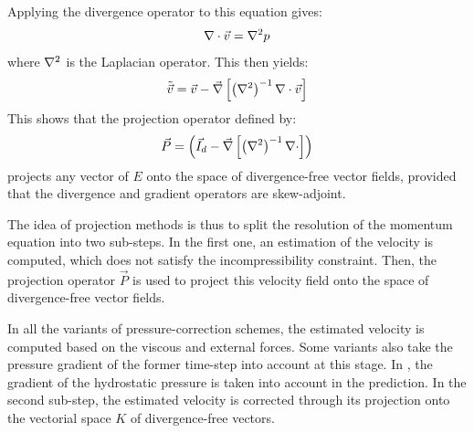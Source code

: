 Applying the divergence operator to this equation gives:
\begin{equation}
  \nabla \cdot \vec v = \nabla^2 p
\end{equation}
where $\nabla^2$ is the Laplacian operator. This then yields:
\begin{equation}
  \tilde {\vec {v}} = \vec v - \vec \nabla \left[\left(\nabla^2 \right)^{-1} \nabla \cdot \vec v\right]
\end{equation}
This shows that the projection operator defined by:
\begin{equation}
  \vec P = \left(\vec{I}_d-\vec \nabla \left[\left(\nabla^2 \right)^{-1} \nabla \cdot \right]\right)
\end{equation}
projects any vector of $E$ onto the space of divergence-free vector fields, provided that the divergence and gradient operators are skew-adjoint.

The idea of projection methods is thus to split the resolution of the momentum equation into two sub-steps.
In the first one, an estimation of the velocity is computed, which does not satisfy the incompressibility constraint.
Then, the projection operator $\vec P$ is used to project this velocity field onto the space of divergence-free vector fields.

In all the variants of pressure-correction schemes, the estimated velocity is computed based on the viscous and external forces.
Some variants also take the pressure gradient of the former time-step into account at this stage.
In , the gradient of the hydrostatic pressure is taken into account in the prediction.
In the second sub-step, the estimated velocity is corrected through its projection onto the vectorial space $K$ of divergence-free vectors.

